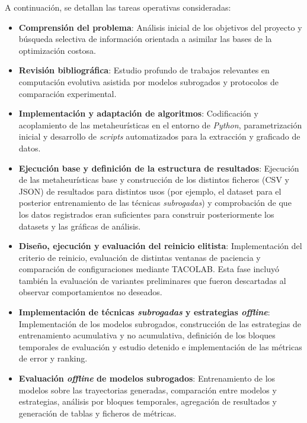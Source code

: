 A continuación, se detallan las tareas operativas consideradas:

\begin{itemize}
    \item \textbf{Comprensión del problema}: Análisis inicial de los objetivos del proyecto y búsqueda selectiva de información orientada a asimilar las bases de la optimización costosa.

    \item \textbf{Revisión bibliográfica}: Estudio profundo de trabajos relevantes en computación evolutiva asistida por modelos subrogados y protocolos de comparación experimental.

    \item \textbf{Implementación y adaptación de algoritmos}: Codificación y acoplamiento de las metaheurísticas en el entorno de \textit{Python}, parametrización inicial y desarrollo de \textit{scripts} automatizados para la extracción y graficado de datos.

    \item \textbf{Ejecución base y definición de la estructura de resultados}: Ejecución de las metaheurísticas base y construcción de los distintos ficheros (CSV y JSON) de resultados para distintos usos (por ejemplo, el dataset para el posterior entrenamiento de las técnicas \textit{subrogadas}) y comprobación de que los datos registrados eran suficientes para construir posteriormente los datasets y las gráficas de análisis.

    \item \textbf{Diseño, ejecución y evaluación del reinicio elitista}:
          Implementación del criterio de reinicio, evaluación de distintas ventanas de paciencia y comparación de configuraciones mediante TACOLAB. Esta fase incluyó también la evaluación de variantes preliminares que fueron descartadas al observar comportamientos no deseados.

    \item \textbf{Implementación de técnicas \textit{subrogadas} y estrategias \textit{offline}}: Implementación de los modelos subrogados, construcción de las estrategias de entrenamiento acumulativa y no acumulativa, definición de los bloques temporales de evaluación y estudio detenido e implementación de las métricas de error y ranking.

    \item \textbf{Evaluación \textit{offline} de modelos subrogados}: Entrenamiento de los modelos sobre las trayectorias generadas, comparación entre modelos y estrategias, análisis por bloques temporales, agregación de resultados y generación de tablas y ficheros de métricas.


\end{itemize}
